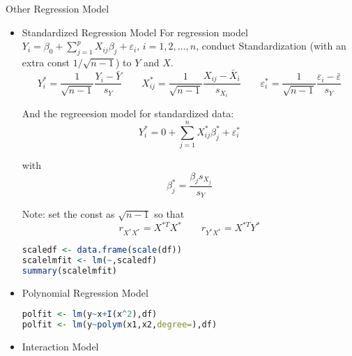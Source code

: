 
\begin{point}
    Other Regression Model
\end{point}

\begin{itemize}[topsep=2pt,itemsep=0pt]
       \item Standardized Regression Model
For regression model $Y_i=\beta _0+\sum_{j=1}^pX_{ij}\beta _j +\varepsilon_i,\, i=1,2,\ldots,n  $, conduct Standardization (with an extra const $ 1/\sqrt{n-1} $) to $ Y $ and $ X $.
\begin{equation}
    Y^*_i=\dfrac{1}{\sqrt{n-1}}\dfrac{Y_i-\bar{Y}}{s_Y}\qquad X_{ij}^*=\dfrac{1}{\sqrt{n-1}}\dfrac{X_{ij}-\bar{X}_i}{s_{X_i}}\qquad \varepsilon _i^*=\dfrac{1}{\sqrt{n-1}}\dfrac{\varepsilon _i-\bar{\varepsilon }}{s_Y} 
\end{equation}

And the regreeesion model for standardized data:
\begin{equation}
    Y^*_i=0+\sum_{j=1}^nX_{ij}^*\beta _j^*+\varepsilon _i^* 
\end{equation}

with
\begin{equation}
    \beta _j^*=\dfrac{\beta _js_{X_j}}{s_Y} 
\end{equation}

Note: set the const as $ \sqrt{n-1} $ so that 
\begin{equation}
    r_{X^*X^*}=X^{*T}X^* \qquad r_{Y^*X^*}=X^{*T}Y^*
\end{equation}
\begin{rcode}
\begin{lstlisting}[language=R]
scaledf <- data.frame(scale(df))
scalelmfit <- lm(~,scaledf)
summary(scalelmfit)
\end{lstlisting}
\end{rcode}
    \item Polynomial Regression Model

\begin{rcode}
\begin{lstlisting}[language=R]
polfit <- lm(y~x+I(x^2),df)
polfit <- lm(y~polym(x1,x2,degree=),df)
\end{lstlisting}
\end{rcode}
    
    \item Interaction Model


\end{itemize}

